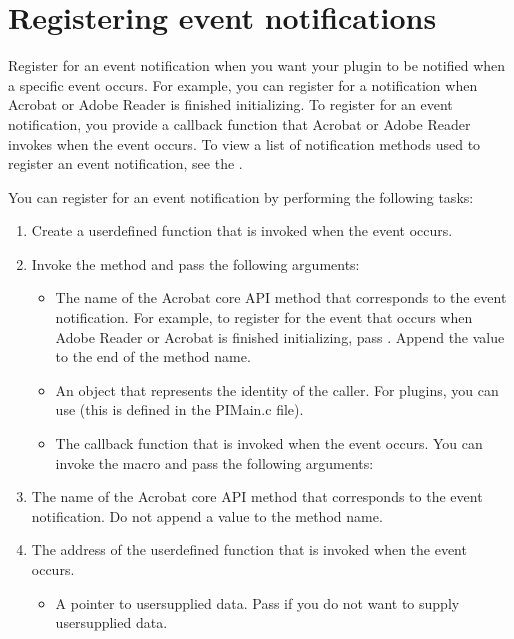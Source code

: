 \documentclass[letterpaper,12pt,english,openany,oneside]{sphinxmanual}
\begin{document}
\section{Registering event notifications}
\label{\detokenize{Plugins_Notification:registering-event-notifications}}
Register for an event notification when you want your plugin to be notified when a specific event occurs. For example, you can register for a notification when Acrobat or Adobe Reader is finished initializing. To register for an event notification, you provide a callback function that Acrobat or Adobe Reader invokes when the event occurs. To view a list of notification methods used to register an event notification, see the .

You can register for an event notification by performing the following tasks:
\begin{enumerate}
%
\item {} 
Create a user\sphinxhyphen{}defined function that is invoked when the event occurs.

\item {} 
Invoke the  method and pass the following arguments:
\begin{itemize}
\item {} 
The name of the Acrobat core API method that corresponds to the event notification. For example, to register for the event that occurs when Adobe Reader or Acrobat is finished initializing, pass . Append the value  to the end of the method name.

\item {} 
An  object that represents the identity of the caller. For plugins, you can use  (this is defined in the PIMain.c file).

\item {} 
The callback function that is invoked when the event occurs. You can invoke the  macro and pass the following arguments:

\end{itemize}

\item {} 
The name of the Acrobat core API method that corresponds to the event notification. Do not append a value to the method name.

\item {} 
The address of the user\sphinxhyphen{}defined function that is invoked when the event occurs.
\begin{itemize}
\item {} 
A pointer to user\sphinxhyphen{}supplied data. Pass  if you do not want to supply user\sphinxhyphen{}supplied data.

\end{itemize}

\end{enumerate}
\end{document}
